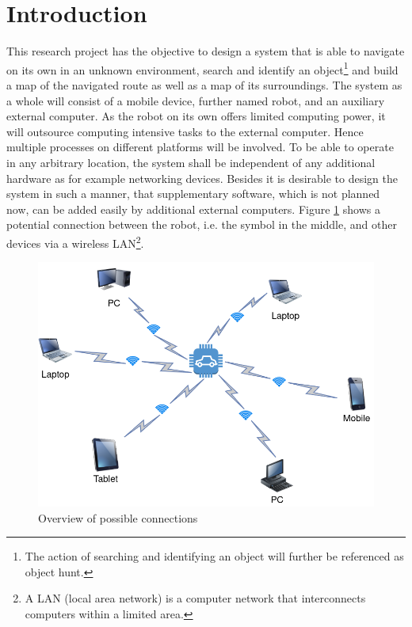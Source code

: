 \cleardoublepage
\pagestyle{fancy} %
\fancyhead{}
\fancyhf{}
\renewcommand{\headrulewidth}{0pt}
\renewcommand{\footrulewidth}{0.4pt}

\section{Introduction}

This research project has the objective to design a system that is able to navigate on its own in an unknown environment, search and identify an object\footnote{The action of searching and identifying an object will further be referenced as object hunt.} and build a map of the navigated route as well as a map of its surroundings. The system as a whole will consist of a mobile device, further named robot, and an auxiliary external computer. As the robot on its own offers limited computing power, it will outsource computing intensive tasks to the external computer. Hence multiple processes on different platforms will be involved. To be able to operate in any arbitrary location, the system shall be independent of any additional hardware as for example networking devices. Besides it is desirable to design the system in such a manner, that supplementary software, which is not planned now, can be added easily by additional external computers. Figure \ref{fig:connection} shows a potential connection between the robot, i.e. the symbol in the middle, and other devices via a wireless LAN\footnote{A LAN (local area network) is a computer network that interconnects computers within a limited area.}.

\begin{figure}[H]
\centering
\includegraphics[scale=0.45]{sources/connection_overview.png}
\caption[Overview of possible connections]{Overview of possible connections}
\label{fig:connection}
\end{figure}

